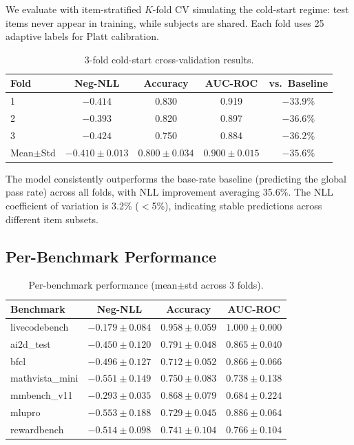 \documentclass{article}
\begin{document}
We evaluate with item-stratified $K$-fold CV simulating the cold-start regime: test items never appear in training, while subjects are shared.
Each fold uses 25 adaptive labels for Platt calibration.

\begin{table}[h]
\centering
\caption{3-fold cold-start cross-validation results.}
\label{tab:cv}
\begin{tabular}{lcccc}
\toprule
Fold & Neg-NLL & Accuracy & AUC-ROC & vs.\ Baseline \\
\midrule
1 & $-0.414$ & 0.830 & 0.919 & $-33.9\%$ \\
2 & $-0.393$ & 0.820 & 0.897 & $-36.6\%$ \\
3 & $-0.424$ & 0.750 & 0.884 & $-36.2\%$ \\
\midrule
Mean$\pm$Std & $-0.410 \pm 0.013$ & $0.800 \pm 0.034$ & $0.900 \pm 0.015$ & $-35.6\%$ \\
\bottomrule
\end{tabular}
\end{table}

The model consistently outperforms the base-rate baseline (predicting the global pass rate) across all folds, with NLL improvement averaging 35.6\%.
The NLL coefficient of variation is 3.2\% ($<$5\%), indicating stable predictions across different item subsets.

\subsection{Per-Benchmark Performance}

\begin{table}[h]
\centering
\caption{Per-benchmark performance (mean$\pm$std across 3 folds).}
\label{tab:bench}
\begin{tabular}{lccc}
\toprule
Benchmark & Neg-NLL & Accuracy & AUC-ROC \\
\midrule
livecodebench & $-0.179 \pm 0.084$ & $0.958 \pm 0.059$ & $1.000 \pm 0.000$ \\
ai2d\_test & $-0.450 \pm 0.120$ & $0.791 \pm 0.048$ & $0.865 \pm 0.040$ \\
bfcl & $-0.496 \pm 0.127$ & $0.712 \pm 0.052$ & $0.866 \pm 0.066$ \\
mathvista\_mini & $-0.551 \pm 0.149$ & $0.750 \pm 0.083$ & $0.738 \pm 0.138$ \\
mmbench\_v11 & $-0.293 \pm 0.035$ & $0.868 \pm 0.079$ & $0.684 \pm 0.224$ \\
mlupro & $-0.553 \pm 0.188$ & $0.729 \pm 0.045$ & $0.886 \pm 0.064$ \\
rewardbench & $-0.514 \pm 0.098$ & $0.741 \pm 0.104$ & $0.766 \pm 0.104$ \\
\bottomrule
\end{tabular}
\end{table}
\end{document}
